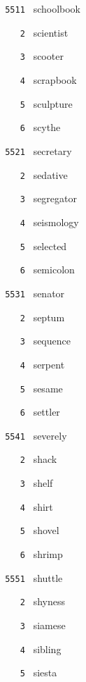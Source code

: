 \documentclass[11pt]{article}
\begin{document}
\begin{multicols}{6}
\noindent \texttt{ 5511 } schoolbook  \par
\noindent \texttt{ \ \ \ 2 } scientist  \par
\noindent \texttt{ \ \ \ 3 } scooter  \par
\noindent \texttt{ \ \ \ 4 } scrapbook  \par
\noindent \texttt{ \ \ \ 5 } sculpture  \par
\noindent \texttt{ \ \ \ 6 } scythe  \par
\vspace{3mm}
\noindent \texttt{ 5521 } secretary  \par
\noindent \texttt{ \ \ \ 2 } sedative  \par
\noindent \texttt{ \ \ \ 3 } segregator  \par
\noindent \texttt{ \ \ \ 4 } seismology  \par
\noindent \texttt{ \ \ \ 5 } selected  \par
\noindent \texttt{ \ \ \ 6 } semicolon  \par
\vspace{3mm}
\noindent \texttt{ 5531 } senator  \par
\noindent \texttt{ \ \ \ 2 } septum  \par
\noindent \texttt{ \ \ \ 3 } sequence  \par
\noindent \texttt{ \ \ \ 4 } serpent  \par
\noindent \texttt{ \ \ \ 5 } sesame  \par
\noindent \texttt{ \ \ \ 6 } settler  \par
\vspace{3mm}
\noindent \texttt{ 5541 } severely  \par
\noindent \texttt{ \ \ \ 2 } shack  \par
\noindent \texttt{ \ \ \ 3 } shelf  \par
\noindent \texttt{ \ \ \ 4 } shirt  \par
\noindent \texttt{ \ \ \ 5 } shovel  \par
\noindent \texttt{ \ \ \ 6 } shrimp  \par
\vspace{3mm}
\noindent \texttt{ 5551 } shuttle  \par
\noindent \texttt{ \ \ \ 2 } shyness  \par
\noindent \texttt{ \ \ \ 3 } siamese  \par
\noindent \texttt{ \ \ \ 4 } sibling  \par
\noindent \texttt{ \ \ \ 5 } siesta  \par

\end{multicols}
\end{document}
